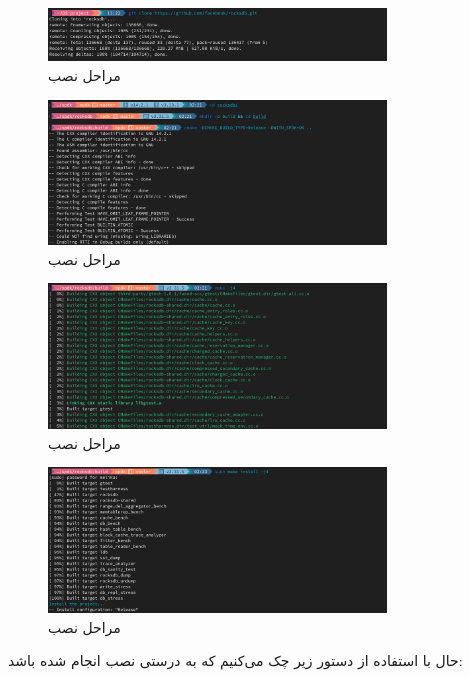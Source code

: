 \documentclass[12pt]{article}
\begin{document}
{\begin{figure}[h]
    \centering
    \includegraphics[width=0.8\textwidth]{1t.png}
    \caption{مراحل نصب }
\end{figure}
\begin{figure}[h]
    \centering
    \includegraphics[width=0.8\textwidth]{2t.png}
    \caption{مراحل نصب }
\end{figure}
\begin{figure}[h]
    \centering
    \includegraphics[width=0.8\textwidth]{3t.png}
    \caption{مراحل نصب }
\end{figure}
\begin{figure}[h]
    \centering
    \includegraphics[width=0.8\textwidth]{4t.png}
    \caption{مراحل نصب }
\end{figure}

حال با استفاده از دستور زیر چک می‌کنیم که به درستی نصب انجام شده باشد:\\

}
\end{document}
